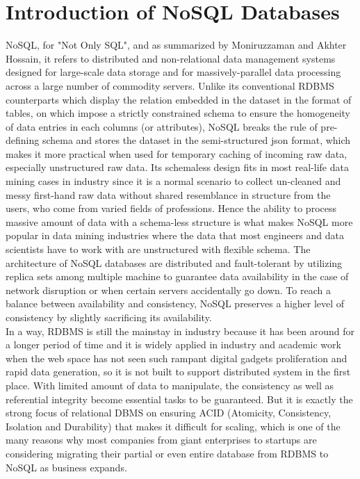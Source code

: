 \section{Introduction of NoSQL Databases}

NoSQL, for "Not Only SQL", and as summarized by Moniruzzaman and Akhter Hossain\cite{DBLP:journals/corr/MoniruzzamanH13}, it refers to distributed and non-relational data management systems designed for large-scale data
storage and for massively-parallel data processing across a large number of commodity
servers. Unlike its conventional RDBMS counterparts which display the relation embedded in the dataset in the format of tables, on which impose a strictly constrained schema to ensure the homogeneity of data entries in each columns (or attributes), NoSQL breaks the rule of pre-defining schema and stores the dataset in the semi-structured json format, which makes it more practical when used for temporary caching of incoming raw data, especially unstructured raw data. Its schemaless design fits in most real-life data mining cases in industry since it is a normal scenario to collect un-cleaned and messy first-hand raw data without shared resemblance in structure from the users, who come from varied fields of professions. Hence the ability to process massive amount of data with a schema-less structure is what makes NoSQL more popular in data mining industries where the data that most engineers and data scientists have to work with are  unstructured with flexible schema.
The architecture of NoSQL databases are distributed and fault-tolerant by utilizing replica sets among multiple machine to 
guarantee data availability in the case of network disruption or when certain servers accidentally go down.
To reach a
balance between availability and consistency, NoSQL preserves a higher
level of consistency by slightly sacrificing its availability.  \\


\noindent In a way, RDBMS is still the mainstay in industry because it has been around for a longer period of time and it is widely applied in industry and academic work when the web space has not seen such rampant digital gadgets proliferation and rapid data generation, so it is not built to support distributed system in the first place. With limited amount of data to manipulate, the consistency as well as referential integrity become essential tasks to be guaranteed. But it is exactly the strong focus of relational DBMS on ensuring ACID \cite{Schram2012MySQLTN} (Atomicity, Consistency, Isolation and
Durability) that makes it difficult for scaling, which is one of
the many reasons why most companies from giant enterprises to startups are considering migrating their partial or even entire database from RDBMS to NoSQL as business expands. \\

